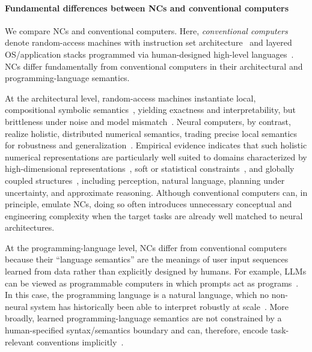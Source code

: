 \paragraph{Fundamental differences between NCs and conventional computers}
We compare NCs and conventional computers.
Here, \emph{conventional computers} denote random-access machines with instruction set architecture~\citep{hartmanis1974power,anagnostopoulos1973computer} and layered OS/application stacks programmed via human-designed high-level languages~\citep{backus1957fortran,backus1963revised}.
NCs differ fundamentally from conventional computers in their architectural and programming-language semantics.

At the architectural level, random-access machines instantiate local, compositional symbolic semantics~\citep{Newell1976}, yielding exactness and interpretability, but brittleness under noise and model mismatch~\citep{BROOKS1991139}. 
Neural computers, by contrast, realize holistic, distributed numerical semantics, trading precise local semantics for robustness and generalization~\citep{ivakhnenko1965,ivakhnenko1967,ivakhnenko1968,ivakhnenko1971,Hinton1986,Bishop2006}. 
Empirical evidence indicates that such holistic numerical representations are particularly well suited to domains characterized by high-dimensional representations~\citep{bengio2013representation}, soft or statistical constraints~\citep{Smolensky1988-SMOOTP-2}, and globally coupled structures~\citep{silver2017mastering,vaswani2017attention}, including perception, natural language, planning under uncertainty, and approximate reasoning.
Although conventional computers can, in principle, emulate NCs, doing so often introduces unnecessary conceptual and engineering complexity when the target tasks are already well matched to neural architectures.

At the programming-language level, NCs differ from conventional computers because their ``language semantics'' are the meanings of user input sequences learned from data rather than explicitly designed by humans. For example, LLMs can be viewed as programmable computers in which prompts act as programs~\citep{Reynolds2021}. In this case, the programming language is a natural language, which no non-neural system has historically been able to interpret robustly at scale~\citep{jm3}. 
More broadly, learned programming-language semantics are not constrained by a human-specified syntax/semantics boundary and can, therefore, encode task-relevant conventions implicitly~\citep{wei2023chainofthoughtpromptingelicitsreasoning}.

